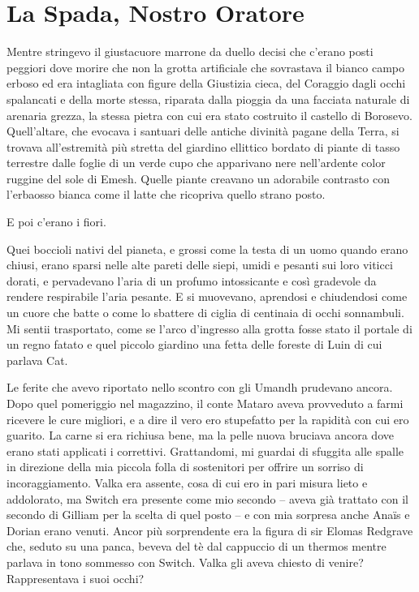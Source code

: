 \chapter{La Spada, Nostro Oratore}

Mentre stringevo il giustacuore marrone da duello decisi che c'erano
posti peggiori dove morire che non la grotta artificiale che sovrastava
il bianco campo erboso ed era intagliata con figure della Giustizia
cieca, del Coraggio dagli occhi spalancati e della morte stessa,
riparata dalla pioggia da una facciata naturale di arenaria grezza, la
stessa pietra con cui era stato costruito il castello di Borosevo.
Quell'altare, che evocava i santuari delle antiche divinità pagane della
Terra, si trovava all'estremità più stretta del giardino ellittico
bordato di piante di tasso terrestre dalle foglie di un verde cupo che
apparivano nere nell'ardente color ruggine del sole di Emesh. Quelle
piante creavano un adorabile contrasto con l'erbaosso bianca come il
latte che ricopriva quello strano posto.

E poi c'erano i fiori.

Quei boccioli nativi del pianeta, e grossi come la testa di un uomo
quando erano chiusi, erano sparsi nelle alte pareti delle siepi, umidi e
pesanti sui loro viticci dorati, e pervadevano l'aria di un profumo
intossicante e così gradevole da rendere respirabile l'aria pesante. E
si muovevano, aprendosi e chiudendosi come un cuore che batte o come lo
sbattere di ciglia di centinaia di occhi sonnambuli. Mi sentii
trasportato, come se l'arco d'ingresso alla grotta fosse stato il
portale di un regno fatato e quel piccolo giardino una fetta delle
foreste di Luin di cui parlava Cat.

Le ferite che avevo riportato nello scontro con gli Umandh prudevano
ancora. Dopo quel pomeriggio nel magazzino, il conte Mataro aveva
provveduto a farmi ricevere le cure migliori, e a dire il vero ero
stupefatto per la rapidità con cui ero guarito. La carne si era richiusa
bene, ma la pelle nuova bruciava ancora dove erano stati applicati i
correttivi. Grattandomi, mi guardai di sfuggita alle spalle in direzione
della mia piccola folla di sostenitori per offrire un sorriso di
incoraggiamento. Valka era assente, cosa di cui ero in pari misura lieto
e addolorato, ma Switch era presente come mio secondo -- aveva già
trattato con il secondo di Gilliam per la scelta di quel posto -- e con
mia sorpresa anche Anaïs e Dorian erano venuti. Ancor più sorprendente
era la figura di sir Elomas Redgrave che, seduto su una panca, beveva
del tè dal cappuccio di un thermos mentre parlava in tono sommesso con
Switch. Valka gli aveva chiesto di venire? Rappresentava i suoi occhi?

